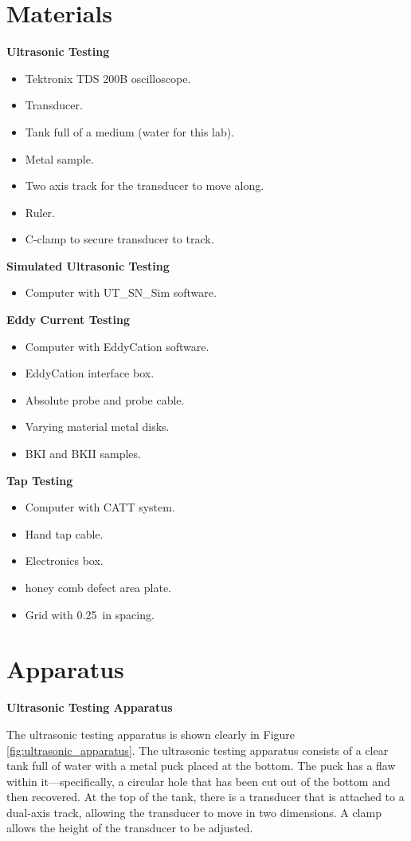 \documentclass[12 pt]{report}
\begin{document}
\section{Materials} \label{materials}
\textbf{Ultrasonic Testing}
\begin{itemize}
	\item Tektronix TDS 200B oscilloscope.
	\item Transducer.
	\item Tank full of a medium (water for this lab).
	\item Metal sample.
	\item Two axis track for the transducer to move along.
	\item Ruler.
	\item C-clamp to secure transducer to track.
\end{itemize}

\textbf{Simulated Ultrasonic Testing}
\begin{itemize}
	\item Computer with UT\_SN\_Sim software.
\end{itemize}

\textbf{Eddy Current Testing}
\begin{itemize}
	\item Computer with EddyCation software.
	\item EddyCation interface box.
	\item Absolute probe and probe cable.
	\item Varying material metal disks.
	\item BKI and BKII samples.
\end{itemize}

\textbf{Tap Testing}
\begin{itemize}
	\item Computer with CATT system.
	\item Hand tap cable.
	\item Electronics box.
	\item {} honey comb defect area plate.
	\item Grid with \qty{0.25}{in} spacing.
\end{itemize}

\section{Apparatus} \label{apparatus}
\textbf{Ultrasonic Testing Apparatus}

The ultrasonic testing apparatus is shown clearly in Figure \ref{fig:ultrasonic_apparatus}. The ultrasonic testing apparatus consists of a clear tank full of water with a metal puck placed at the bottom. The puck has a flaw within it---specifically, a circular hole that has been cut out of the bottom and then recovered. At the top of the tank, there is a transducer that is attached to a dual-axis track, allowing the transducer to move in two dimensions. A clamp allows the height of the transducer to be adjusted.
\end{document}
